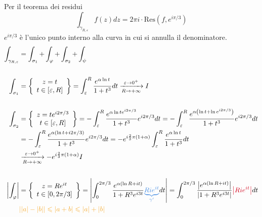 Per il teorema dei residui
\begin{equation*}
\int _{\gamma _{R,\varepsilon }} f\left( z\right) dz=2\pi i\cdotp \mathrm{Res}\left( f,e^{i\pi /3}\right)
\end{equation*}
$e^{i\pi /3}$ è l'unico punto interno alla curva in cui si annulla il denominatore.
\begin{equation*}
\begin{aligned}
\int _{\gamma _{R,\varepsilon }} & =\int _{\sigma _{1}} +\int _{\varphi } +\int _{\sigma _{2}} +\int _{\psi }\\
 & \\
\int _{\sigma _{1}} & =\left\{\begin{array}{ c }
z=t\\
t\in [ \varepsilon ,R]
\end{array}\right\} =\int ^{R}_{\varepsilon }\frac{e^{\alpha \ln t}}{1+t^{3}} dt\xrightarrow[R\rightarrow +\infty ]{\varepsilon \rightarrow 0^{+}} I\\
 & \\
\int _{\sigma _{2}} & =\left\{\begin{array}{ c }
z=te^{i2\pi /3}\\
t\in [ \varepsilon ,R]
\end{array}\right\} =-\int ^{R}_{\varepsilon }\frac{e^{\alpha \ln te^{i2\pi /3}}}{1+t^{3}} e^{i2\pi /3} dt=-\int ^{R}_{\varepsilon }\frac{e^{\alpha \left(\ln t+\ln e^{i2\pi /3}\right)}}{1+t^{3}} e^{i2\pi /3} dt\\
 & =-\int ^{R}_{\varepsilon }\frac{e^{\alpha (\ln t+i2\pi /3)}}{1+t^{3}} e^{i2\pi /3} dt=-e^{i\frac{2}{3} \pi ( 1+\alpha )}\int ^{R}_{\varepsilon }\frac{e^{\alpha \ln t}}{1+t^{3}} dt\\
 & \xrightarrow[R\rightarrow +\infty ]{\varepsilon \rightarrow 0^{+}} -e^{i\frac{2}{3} \pi ( 1+\alpha )} I\\
 & \\
\left| \int _{\varphi }\right|  & =\left\{\begin{array}{ c }
z=Re^{it}\\
t\in [ 0,2\pi /3]
\end{array}\right\} =\left| \int ^{2\pi /3}_{0}\frac{e^{\alpha (\ln R+it)}}{1+R^{3} e^{i3t}}\textcolor[rgb]{0.29,0.56,0.89}{\underbrace{Rie^{it}}_{\gamma '}} dt\right| =\int ^{2\pi /3}_{0}\frac{\left| e^{\alpha (\ln R+it)}\right| }{\left| 1+R^{3} e^{i3t}\right| }\textcolor[rgb]{0.82,0.01,0.11}{\left| Rie^{it}\right| } dt\\
 & \textcolor[rgb]{0.96,0.65,0.14}{| | a| -| b| | \leqslant | a+b| \leqslant | a| +| b| }\\

\end{aligned}
\end{equation*}
